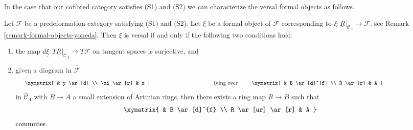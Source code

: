 \noindent
In the case that our cofibred category satisfies (S1) and (S2)
we can characterize the versal formal objects as follows.

\begin{lemma}
\label{lemma-versal-criterion}
Let $\mathcal{F}$ be a predeformation category satisfying (S1) and
(S2). Let $\xi$ be a formal object of $\mathcal{F}$ corresponding to
$\underline{\xi} : \underline{R}|_{\mathcal{C}_\Lambda} \to \mathcal{F}$, see
Remark \ref{remark-formal-objects-yoneda}.
Then $\xi$ is versal if and only if the following two conditions hold:
\begin{enumerate}
\item the map
$d\underline{\xi} : T\underline{R}|_{\mathcal{C}_\Lambda} \to T\mathcal{F}$
on tangent spaces is surjective, and
\item given a diagram in $\widehat{\mathcal{F}}$
$$
\vcenter{
\xymatrix{
            &  y \ar[d] \\
\xi \ar[r]  &  x
}
}
\quad\text{lying over}\quad
\vcenter{
\xymatrix{
         &   B  \ar[d]^{f} \\
R \ar[r] &   A
}
}
$$
in $\widehat{\mathcal{C}}_\Lambda$ with $B \to A$ a small extension of
Artinian rings, then there exists a ring map $R \to B$ such that
$$
\xymatrix{
         &   B  \ar[d]^{f} \\
R \ar[ur] \ar[r] &   A
}
$$
commutes.
\end{enumerate}
\end{lemma}

